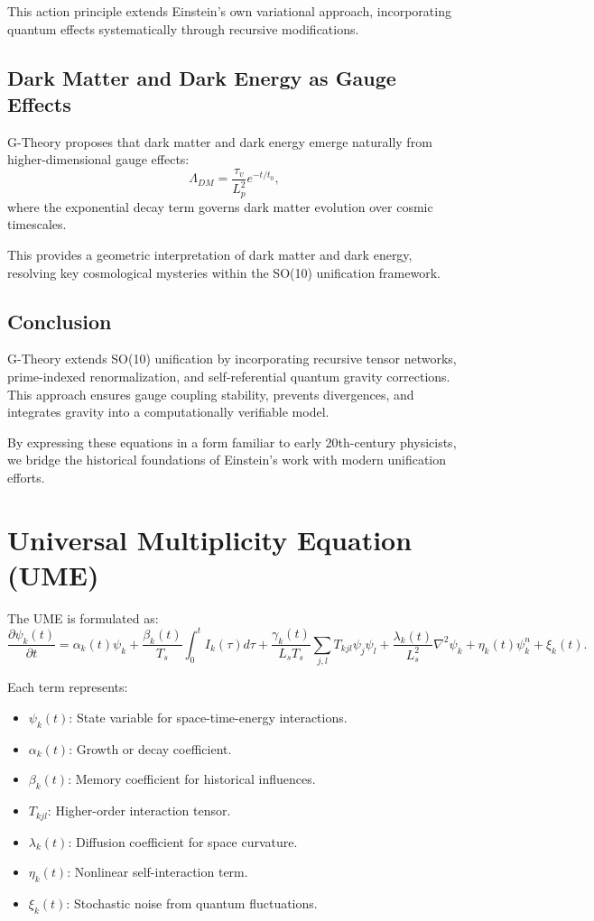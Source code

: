 \documentclass[12]{amsart}
\theoremstyle{plain}
\begin{document}
This action principle extends Einstein’s own variational approach, incorporating quantum effects systematically through recursive modifications.

\subsection{Dark Matter and Dark Energy as Gauge Effects}
G-Theory proposes that dark matter and dark energy emerge naturally from higher-dimensional gauge effects:
\begin{equation}
    \Lambda_{DM} = \frac{\tau_v}{L_p^2} e^{-t/t_0},
\end{equation}
where the exponential decay term governs dark matter evolution over cosmic timescales.

This provides a geometric interpretation of dark matter and dark energy, resolving key cosmological mysteries within the SO(10) unification framework.

\subsection{Conclusion}
G-Theory extends SO(10) unification by incorporating recursive tensor networks, prime-indexed renormalization, and self-referential quantum gravity corrections. This approach ensures gauge coupling stability, prevents divergences, and integrates gravity into a computationally verifiable model.

By expressing these equations in a form familiar to early 20th-century physicists, we bridge the historical foundations of Einstein’s work with modern unification efforts.



\section{Universal Multiplicity Equation (UME)}

The UME is formulated as:
\begin{equation}
\frac{\partial \psi_k (t)}{\partial t} = \alpha_k (t) \psi_k + \frac{\beta_k (t)}{T_s} \int_0^t I_k (\tau) d\tau + \frac{\gamma_k (t)}{L_s T_s} \sum_{j,l} T_{kjl} \psi_j \psi_l + \frac{\lambda_k (t)}{L_s^2} \nabla^2 \psi_k + \eta_k (t) \psi_k^n + \xi_k (t).
\end{equation}

Each term represents:
\begin{itemize}
    \item $\psi_k(t)$: State variable for space-time-energy interactions.
    \item $\alpha_k (t)$: Growth or decay coefficient.
    \item $\beta_k (t)$: Memory coefficient for historical influences.
    \item $T_{kjl}$: Higher-order interaction tensor.
    \item $\lambda_k (t)$: Diffusion coefficient for space curvature.
    \item $\eta_k (t)$: Nonlinear self-interaction term.
    \item $\xi_k (t)$: Stochastic noise from quantum fluctuations.
\end{itemize}
\end{document}

